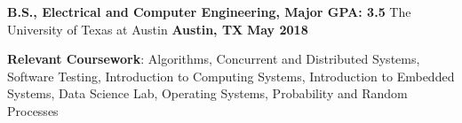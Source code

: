 \begin{cventries}
  \cventry
    {\textbf{\normalsize B.S., Electrical and Computer Engineering, Major GPA: \large 3.5}}
    {\large The University of Texas at Austin}
    {\normalsize \textbf{Austin, TX}}
    {\normalsize \textbf{May 2018}}
    {
        \begin{cvitems}
        \item {\normalsize \textbf{Relevant Coursework}: Algorithms, Concurrent and Distributed Systems, Software Testing, Introduction to Computing Systems, Introduction to Embedded Systems, Data Science Lab, Operating Systems, Probability and Random Processes }
        \end{cvitems}
    }
\end{cventries}
